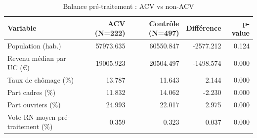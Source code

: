 \begin{table}
\caption{Balance pré-traitement : ACV vs non-ACV}
\label{tab:balance}
\begin{tabular}{lrrrr}
\toprule
Variable & ACV (N=222) & Contrôle (N=497) & Différence & p-value \\
\midrule
Population (hab.) & 57973.635 & 60550.847 & -2577.212 & 0.124 \\
Revenu médian par UC (€) & 19005.923 & 20504.497 & -1498.574 & 0.000 \\
Taux de chômage (\%) & 13.787 & 11.643 & 2.144 & 0.000 \\
Part cadres (\%) & 11.832 & 14.062 & -2.230 & 0.000 \\
Part ouvriers (\%) & 24.993 & 22.017 & 2.975 & 0.000 \\
Vote RN moyen pré-traitement (\%) & 0.359 & 0.323 & 0.037 & 0.000 \\
\bottomrule
\end{tabular}
\end{table}
